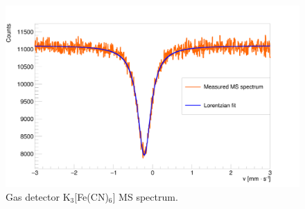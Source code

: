 \begin{figure}[H]
\centering
\includegraphics[scale=0.125, angle = 0]{./pictures/MossGas.png}
\caption{Gas detector K$_{3}[$Fe(CN)$_{6}]$ MS spectrum.}
\label{Gas detector MS spectra.}

\end{figure}

